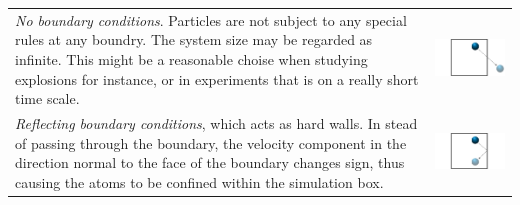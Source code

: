 \documentclass[twoside,english]{uiofysmaster}
\begin{document}
\hspace{-9.37mm}
\begin{tabular}{p{} p{}}
	\vspace{0pt}  {\it No boundary conditions}. Particles are not subject to any special rules at any boundry. The system size may be regarded as infinite. This  might be a reasonable choise when studying explosions for instance, or in experiments that is on a really short time scale.  
	& \vspace{0pt} \hspace*{-1.3cm} \includegraphics[width=1.3\linewidth]{figures/BoundaryConditions/no.pdf} 
	\\*
	\vspace{0pt} {\it Reflecting boundary conditions}, which acts as hard walls. In stead of passing through the boundary, the velocity component in the direction normal to the face of the boundary changes sign, thus causing the atoms to be confined within the simulation box. 
	& \vspace{0pt} \hspace*{-1.3cm} \includegraphics[width=1.3\linewidth]{figures/BoundaryConditions/reflecting.pdf} 
	\\*

\end{tabular}
\end{document}
